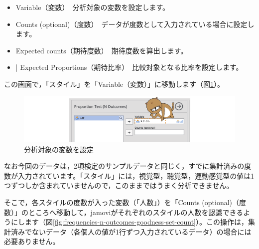 \documentclass[
  12pt,
  a5jpaper,
  lualatex, ja=standard]{bxjsbook}
\providecommand{\tightlist}{%
  \setlength{\itemsep}{0pt}\setlength{\parskip}{0pt}}
\newenvironment{jmvsettings}{%
	\begin{center}%
	\begin{tcolorbox}[%
		title=設定項目,
		colframe=gmoji,
		colbacktitle=gmoji,
		colback=gmoji!2!white,
		breakable,
		width=.9\textwidth,
		]\small\addtolength{\leftmargini}{-3\labelsep}%
	}%
	{\end{tcolorbox}\end{center}}
\begin{document}
\begin{jmvsettings}

\begin{itemize}
\tightlist
\item
  Variable（変数）　分析対象の変数を設定します。
\item
  Counts (optional)（度数）　データが度数として入力されている場合に設定します。
\item
  Expected counts（期待度数）　期待度数を算出します。
\item
  \colorbox{bar}{\textcolor{gmoji2}{| Expected Proportions}}（期待比率）　比較対象となる比率を設定します。
\end{itemize}

\end{jmvsettings}

この画面で，「スタイル」を「Variable（変数）」に移動します（図\ref{fig:frequencies-n-outcomes-goodness-set-var}）。

\begin{figure}[!ht]

{\centering \includegraphics[width=1\linewidth]{images/frequencies/n-outcomes-goodness-set-var} 

}

\caption{分析対象の変数を設定}\label{fig:frequencies-n-outcomes-goodness-set-var}
\end{figure}

なお今回のデータは，2項検定のサンプルデータと同じく，すでに集計済みの度数が入力されています。「スタイル」には，視覚型，聴覚型，運動感覚型の値は1つずつしか含まれていませんので，このままではうまく分析できません。

そこで，各スタイルの度数が入った変数（「人数」）を「Counts (optional)（度数）」のところへ移動して，jamoviがそれぞれのスタイルの人数を認識できるようにします（図\ref{fig:frequencies-n-outcomes-goodness-set-count}）。この操作は，集計済みでないデータ（各個人の値が1行ずつ入力されているデータ）の場合には必要ありません。
\end{document}
